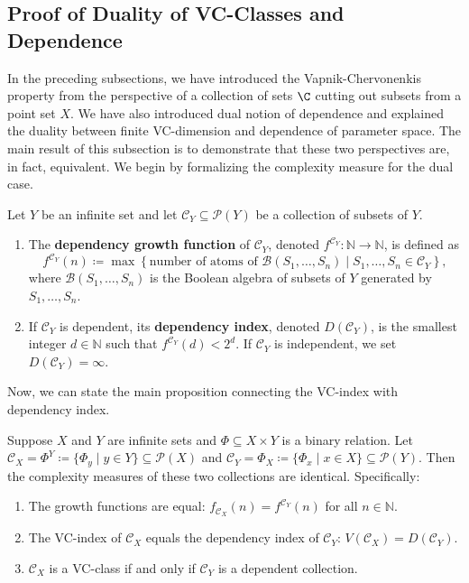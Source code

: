 \subsection{Proof of Duality of VC-Classes and Dependence}

In the preceding subsections, we have introduced the Vapnik-Chervonenkis property from the perspective of a collection of sets $\C$ cutting out subsets from a point set $X$. We have also introduced dual notion of dependence and explained the duality between finite VC-dimension and dependence of parameter space. The main result of this subsection is to demonstrate that these two perspectives are, in fact, equivalent. We begin by formalizing the complexity measure for the dual case.

\begin{definition}
    Let $Y$ be an infinite set and let $\mathcal{C}_Y \subseteq \mathcal{P}(Y)$ be a collection of subsets of $Y$.
    \begin{enumerate}
        \item The \textbf{dependency growth function} of $\mathcal{C}_Y$, denoted $f^{\mathcal{C}_Y}: \mathbb{N} \to \mathbb{N}$, is defined as
        \[
            f^{\mathcal{C}_Y}(n) \coloneq \max \left\{ \text{number of atoms of } \mathcal{B}(S_1, \dots, S_n) \mid S_1, \dots, S_n \in \mathcal{C}_Y \right\},
        \]
        where $\mathcal{B}(S_1, \dots, S_n)$ is the Boolean algebra of subsets of $Y$ generated by $S_1, \dots, S_n$.
        \item If $\mathcal{C}_Y$ is dependent, its \textbf{dependency index}, denoted $D(\mathcal{C}_Y)$, is the smallest integer $d \in \mathbb{N}$ such that $f^{\mathcal{C}_Y}(d) < 2^d$. If $\mathcal{C}_Y$ is independent, we set $D(\mathcal{C}_Y) = \infty$.
    \end{enumerate}
\end{definition}

Now, we can state the main proposition connecting the VC-index with dependency index.

\begin{proposition}\label{prop:vc-dependence-duality}
    Suppose $X$ and $Y$ are infinite sets and $\Phi \subseteq X \times Y$ is a binary relation. Let $\mathcal{C}_X = \Phi^Y \coloneqq \{\Phi_y \mid y \in Y\} \subseteq \mathcal{P}(X)$ and $\mathcal{C}_Y = \Phi_X \coloneqq \{\Phi_x \mid x \in X\} \subseteq \mathcal{P}(Y)$. Then the complexity measures of these two collections are identical. Specifically:
    \begin{enumerate}
        \item The growth functions are equal: $f_{\mathcal{C}_X}(n) = f^{\mathcal{C}_Y}(n)$ for all $n \in \mathbb{N}$.
        \item The VC-index of $\mathcal{C}_X$ equals the dependency index of $\mathcal{C}_Y$: $V(\mathcal{C}_X) = D(\mathcal{C}_Y)$.
        \item $\mathcal{C}_X$ is a VC-class if and only if $\mathcal{C}_Y$ is a dependent collection.
    \end{enumerate}
\end{proposition}

